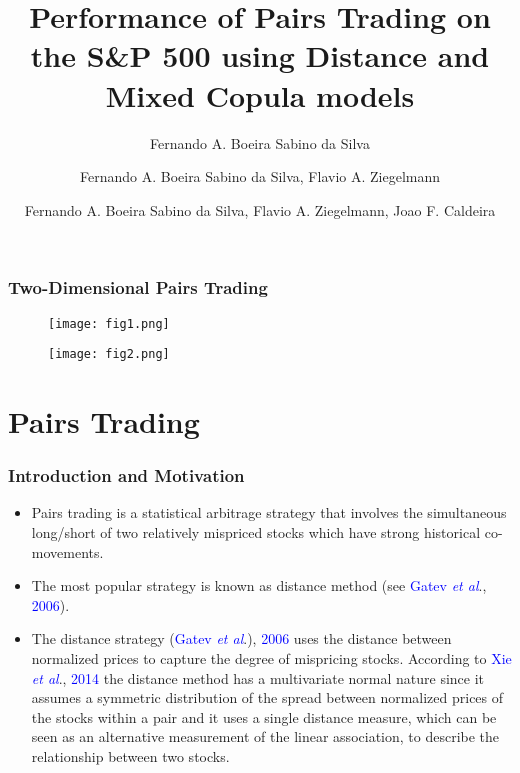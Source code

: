 \documentclass[pdf,9pt,xcolor=dvipsnames,hide notes]{beamer}
\title[PPGE/UFRGS]{Performance of Pairs Trading on the S\&P 500 using Distance and Mixed Copula models }
\author[Fernando A. Boeira Sabino da Silva]{Fernando A. Boeira Sabino da Silva\inst{1}}
\author[Flavio A. Ziegelmann]{Fernando A. Boeira Sabino da Silva\inst{1,2}, Flavio A. Ziegelmann\inst{1,2}}
\author[Joao F. Caldeira]{Fernando A. Boeira Sabino da Silva\inst{1}, Flavio A. Ziegelmann\inst{1,2}, Joao F. Caldeira\inst{2}}
\institute[Department of Statistics/UFRGS, PPGE/UFRGS]{\inst{1} Department of Statistics/UFRGS, \inst{2} PPGE/UFRGS}
\date{} %
\begin{document}
	\justifying
	
	\frame{\titlepage}
	
	
	\begin{frame}
		\frametitle{Two-Dimensional Pairs Trading}
		
		\begin{figure}[htbp]
			\centering
			\texttt{[image: fig1.png]}
			\label{fig:fig1}
		\end{figure}
		
		\begin{figure}[htbp]
			\centering
			\texttt{[image: fig2.png]}
			\label{fig:fig2}
		\end{figure}
		
	\end{frame}
	
	\section{Pairs Trading}
	
	\begin{frame}[label=frame1]
		\frametitle{Introduction and Motivation}
		
		\begin{itemize}
			\justifying
			
			\item Pairs trading is a statistical arbitrage strategy that involves the simultaneous long/short of two
			relatively mispriced stocks which have strong historical co-movements.
			
			\vspace{0.3cm}
			
			\item The most popular strategy is known as distance method (see \textcolor{blue}{Gatev \emph{et al}}., \textcolor{blue}{2006}). 
			
		    \vspace{0.3cm}
			
			\item The distance strategy (\textcolor{blue}{Gatev \emph{et al}}.), \textcolor{blue}{2006} uses the distance between normalized prices to capture the degree of mispricing stocks. According to \textcolor{blue}{Xie \emph{et al}}., \textcolor{blue}{2014} the distance method has a multivariate normal nature since it assumes a symmetric distribution of the spread between normalized prices of the stocks within a pair and it uses a single distance measure, which can be seen as an alternative measurement of the linear association, to describe the relationship between two stocks.
			
		\end{itemize}	
	\end{frame}
	
\end{document}

